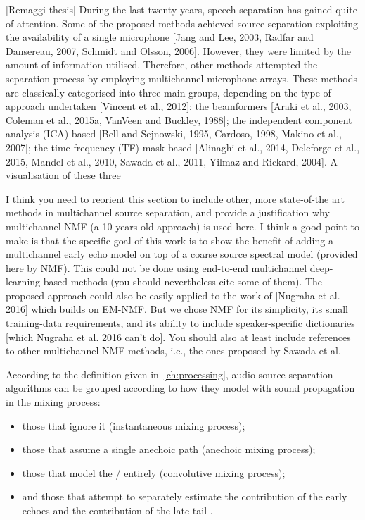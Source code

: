 [Remaggi thesis]
During the last twenty years, speech separation has gained quite of attention. Some of the proposed methods achieved source separation exploiting the availability of a single microphone [Jang and Lee, 2003, Radfar and Dansereau, 2007, Schmidt and Olsson, 2006]. However, they were limited by the amount of information utilised. Therefore, other methods attempted the separation process by employing multichannel microphone arrays. These methods are classically categorised into three main groups, depending on the type of approach undertaken [Vincent et al., 2012]: the beamformers [Araki et al., 2003, Coleman et al., 2015a, VanVeen and Buckley, 1988]; the independent component analysis (ICA) based [Bell and Sejnowski, 1995, Cardoso, 1998, Makino et al., 2007]; the time-frequency (TF) mask based [Alinaghi et al., 2014, Deleforge et al., 2015, Mandel et al., 2010, Sawada et al., 2011, Yilmaz and Rickard, 2004]. A visualisation of these three


I think you need to reorient this section to include other, more state-of-the art methods in multichannel source separation, and provide a justification why multichannel NMF (a 10 years old approach) is used here.
I think a good point to make is that the specific goal of this work is to show the benefit of adding a multichannel early echo model on top of a coarse source spectral model (provided here by NMF).
This could not be done using end-to-end multichannel deep-learning based methods (you should nevertheless cite some of them).
The proposed approach could also be easily applied to the work of [Nugraha et al. 2016] which builds on EM-NMF.
But we chose NMF for its simplicity, its small training-data requirements, and its ability to include speaker-specific dictionaries [which Nugraha et al. 2016 can't do].
You should also at least include references to other multichannel NMF methods, i.e., the ones proposed by Sawada et al.

According to the definition given in~\cref{ch:processing}, audio source separation algorithms can be grouped according to how they model with sound propagation in the mixing process:
\begin{itemize}
    \item those that ignore it  (instantaneous mixing process);
    \item those that assume a single anechoic path  (anechoic mixing process);
    \item those that model the \RTFs/ entirely  (convolutive mixing process);
    \item and those that attempt to separately estimate the contribution of the early echoes and the contribution of the late tail .
\end{itemize}

